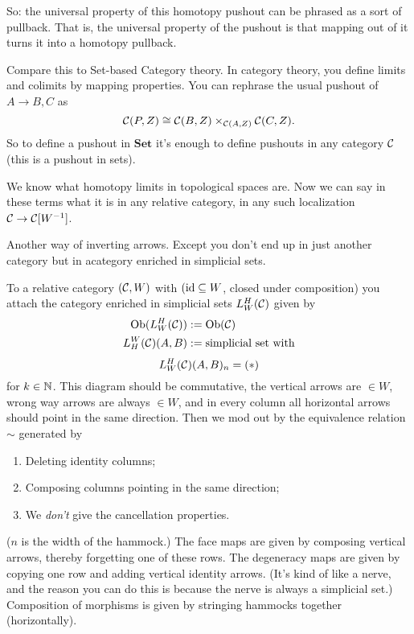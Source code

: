 \documentclass[../MH_Total.tex]{subfiles}
\begin{document}
So: the universal property of this homotopy pushout can be phrased as a sort of pullback. That is, the universal property of the pushout is that mapping out of it turns it into a homotopy pullback.

Compare this to Set-based Category theory. In category theory, you define limits and colimits by mapping properties. You can rephrase the usual pushout of $A \to B,C$ as
\[
\mathcal{C}(P,Z) \cong \mathcal{C}(B,Z) \times_{\mathcal{C}(A,Z)} \mathcal{C}(C,Z). 
\]
So to define a pushout in $\mathbf{Set}$ it's enough to define pushouts in any category $\mathcal{C}$ (this is a pushout in sets). 

We know what homotopy limits in topological spaces are. Now we can say in these terms what it is in any relative category, in any such localization $\mathcal{C} \to \mathcal{C}[W^{-1}]$. 

\begin{definition}
	Another way of inverting arrows. Except you don't end up in just another category but in acategory enriched in simplicial sets.

	To a relative category $(\mathcal{C},W)$ with $(\operatorname{id} \subseteq W$, closed under composition) you attach the category enriched in simplicial sets $L^H_W(\mathcal{C})$ given by
	\begin{align*}
		\operatorname{Ob}(L^H_W(\mathcal{C})) &:= \operatorname{Ob}(\mathcal{C})\\
		L_H^W(\mathcal{C})(A,B) &:= \text{simplicial set with}
	\end{align*}
	\[
	L_W^H(\mathcal{C})(A,B)_n = (*)
	\]
	for $k \in \mathbb{N}$. This diagram should be commutative, the vertical arrows are $\in W$, wrong way arrows are always $\in W$, and in every column all horizontal arrows should point in the same direction. Then we mod out by the equivalence relation $\sim$ generated by
	\begin{enumerate}
		\item Deleting identity columns;
		\item Composing columns pointing in the same direction;
		\item We \emph{don't} give the cancellation properties. 
	\end{enumerate}
	($n$ is the width of the hammock.)
	The face maps are given by composing vertical arrows, thereby forgetting one of these rows.
	The degeneracy maps are given by copying one row and adding vertical identity arrows.
	(It's kind of like a nerve, and the reason you can do this is because the nerve is always a simplicial set.)
	Composition of morphisms is given by stringing hammocks together (horizontally). 
\end{definition}
\end{document}
